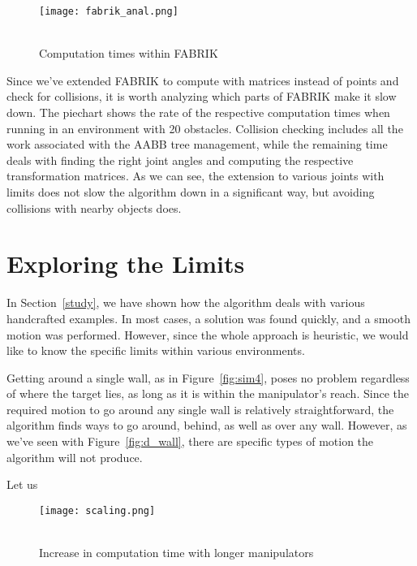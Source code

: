 \begin{wrapfigure}{l}{0.4\textwidth}
  \centering
  \texttt{[image: fabrik\_anal.png]}
  \caption{\\Computation times within FABRIK}
\end{wrapfigure}

Since we've extended FABRIK to compute with matrices instead of points and check for collisions, it is worth analyzing which parts of FABRIK make it slow down. The piechart shows the rate of the respective computation times when running in an environment with 20 obstacles. Collision checking includes all the work associated with the AABB tree management, while the remaining time deals with finding the right joint angles and computing the respective transformation matrices. As we can see, the extension to various joints with limits does not slow the algorithm down in a significant way, but avoiding collisions with nearby objects does.

\section{Exploring the Limits}

In Section~\ref{study}, we have shown how the algorithm deals with various handcrafted examples. In most cases, a solution was found quickly, and a smooth motion was performed. However, since the whole approach is heuristic, we would like to know the specific limits within various environments.

Getting around a single wall, as in Figure~\ref{fig:sim4}, poses no problem regardless of where the target lies, as long as it is within the manipulator's reach. Since the required motion to go around any single wall is relatively straightforward, the algorithm finds ways to go around, behind, as well as over any wall. However, as we've seen with Figure~\ref{fig:d_wall}, there are specific types of motion the algorithm will not produce.

Let us

\begin{wrapfigure}{r}{0.4\textwidth}
  \centering
  \texttt{[image: scaling.png]}
  \caption{\\Increase in computation time with longer manipulators}
\end{wrapfigure}

